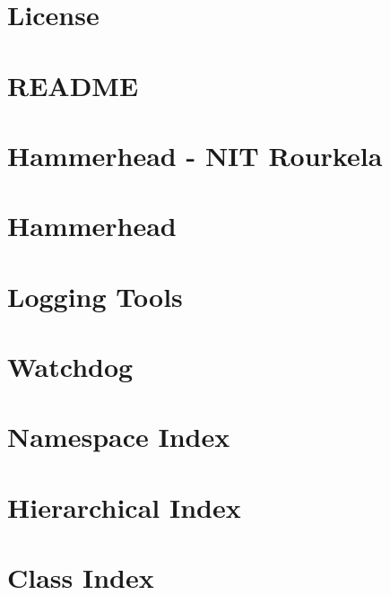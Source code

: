 \documentclass[twoside]{book}
\newcommand{\+}{\discretionary{\mbox{\scriptsize$\hookleftarrow$}}{}{}}
\begin{document}
\chapter{License}
\label{md_src_hammerhead_License}
\hypertarget{md_src_hammerhead_License}{}

\chapter{R\+E\+A\+D\+ME}
\label{md_src_hammerhead_mission_stack_hammerhead_control_README}
\hypertarget{md_src_hammerhead_mission_stack_hammerhead_control_README}{}

\chapter{Hammerhead -\/ N\+IT Rourkela}
\label{md_src_hammerhead_README}
\hypertarget{md_src_hammerhead_README}{}

\chapter{Hammerhead}
\label{md_src_hammerhead_tools_hammerhead_README}
\hypertarget{md_src_hammerhead_tools_hammerhead_README}{}

\chapter{Logging Tools}
\label{md_src_hammerhead_tools_logging_tools_README}
\hypertarget{md_src_hammerhead_tools_logging_tools_README}{}

\chapter{Watchdog}
\label{md_src_hammerhead_tools_watchdog_README}
\hypertarget{md_src_hammerhead_tools_watchdog_README}{}

\chapter{Namespace Index}

\chapter{Hierarchical Index}

\chapter{Class Index}

\end{document}

